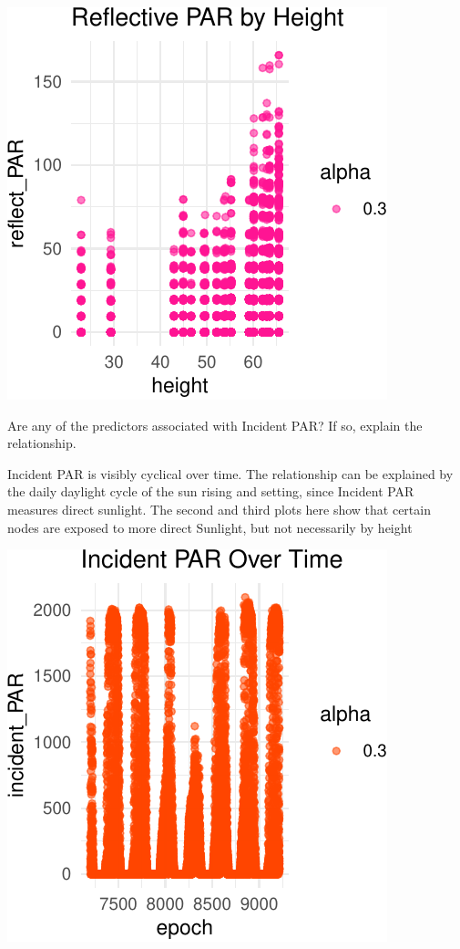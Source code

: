 \documentclass[]{article}
\begin{document}
\begin{center}\includegraphics{Project1WriteUp_files/figure-latex/unnamed-chunk-14-2} \end{center}

Are any of the predictors associated with Incident PAR? If so, explain
the relationship.

Incident PAR is visibly cyclical over time. The relationship can be
explained by the daily daylight cycle of the sun rising and setting,
since Incident PAR measures direct sunlight. The second and third plots
here show that certain nodes are exposed to more direct Sunlight, but
not necessarily by height

\begin{center}\includegraphics{Project1WriteUp_files/figure-latex/unnamed-chunk-15-1} \end{center}
\end{document}
